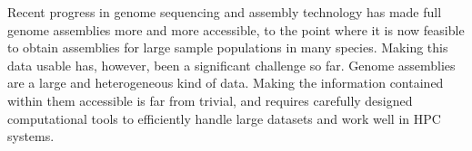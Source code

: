 




Recent progress in genome sequencing and assembly technology has made full genome assemblies more and more accessible, to the point where it is now feasible to obtain assemblies for large sample populations in many species\cite{guo25, avni26}.
Making this data usable has, however, been a significant challenge so far.
Genome assemblies are a large and heterogeneous kind of data.
Making the information contained within them accessible is far from trivial, and requires carefully designed computational tools to efficiently handle large datasets and work well in HPC systems.

